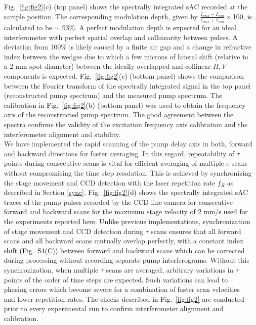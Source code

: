 \documentclass[%
aip,
amsmath,amssymb,
preprint,%
]{revtex4-2}
\newcommand*{\si}[1]{\textcolor{black}{ #1}}
\begin{document}
\si{Fig.~\ref{fig:fig2}(c)} (top panel) shows the spectrally integrated sAC recorded at the sample position. The corresponding modulation depth, given by $\frac{I_{max}- I_{min}}{I_{max}+ I_{min}}\times$100, is calculated to be $\sim$ 93\%. A perfect modulation depth is expected for an ideal interferometer with perfect spatial overlap and collinearity between pulses. A deviation from 100$\%$ is likely caused by a finite air gap and a change in refractive index between the wedges due to which a few microns of lateral shift (relative to a 2 mm spot diameter) between the ideally overlapped and collinear $H,V$ components is expected\cite{Cerullo2014}. \si{Fig.~\ref{fig:fig2}(c)} (bottom panel) shows the comparison between the Fourier transform of the spectrally integrated signal in the top panel (reconstructed pump spectrum) and the measured pump spectrum. The calibration in \si{Fig.~\ref{fig:fig2}(b)} (bottom panel) was used to obtain the frequency axis of the reconstructed pump spectrum. The good agreement between the spectra confirms the validity of the excitation frequency axis calibration and the interferometer alignment and stability.\\

We have implemented the rapid scanning of the pump delay axis in both, forward and backward directions for faster averaging. In this regard, repeatability of $\tau$ points during consecutive scans is vital for efficient averaging of multiple $\tau$ scans without compromising the time step resolution. This is achieved by synchronizing the stage movement and CCD detection with the laser repetition rate $f_R$ as described in Section \ref{sync}. \si{Fig.~\ref{fig:fig2}(d)} shows the spectrally integrated sAC traces of the pump pulses recorded by the CCD line camera for consecutive forward and backward scans for the maximum stage velocity of \si{2 mm/s} used for the experiments reported here. Unlike previous implementations\cite{Cerullo2014}, synchronization of stage movement and CCD detection during $\tau$ scans ensures that all forward scans and all backward scans mutually overlap perfectly, with a constant index shift \si{(Fig.~S4(C))} between forward and backward scans which can be corrected during processing without recording separate pump interferograms. Without this synchronization, when multiple $\tau$ scans are averaged, arbitrary variations in $\tau$ points of the order of time steps are expected\cite{Cerullo2014}. Such variations can lead to phasing errors which become severe for a combination of faster scan velocities and lower repetition rates. The checks described in \si{Fig.~\ref{fig:fig2}} are conducted prior to every experimental run to confirm interferometer alignment and calibration. 
\end{document}

